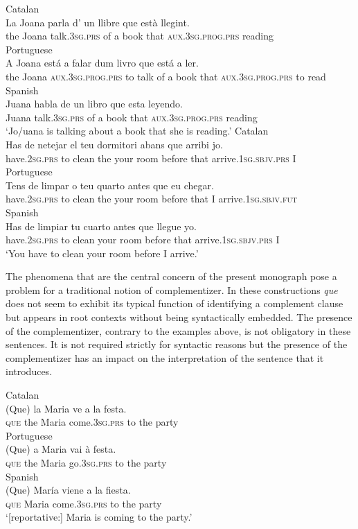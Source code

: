 \ea\label{ex:querel}
\ea
Catalan\\
\gll  La Joana parla d' un llibre que està llegint. \\
 the Joana talk.\textsc{3sg.prs} of a book 	that \textsc{aux.3sg.prog.prs} reading\\
	\ex
	Portuguese\\
	\gll A Joana está a  falar dum livro que está a ler. \\
	 the Joana \textsc{aux.3sg.prog.prs} to talk {of a} book 	that \textsc{aux.3sg.prog.prs} to read\\
\ex
Spanish\\
\gll Juana habla de un libro que esta leyendo. \\
Juana talk.\textsc{3sg.prs} of a book 	that \textsc{aux.3sg.prog.prs} reading\\
\glt`Jo/uana is talking about a book that she is reading.'
\z
\ex\label{ex:queadv} 
\ea
Catalan\\
\gll Has de netejar el teu dormitori abans que arribi jo. \\
have.\textsc{2sg.prs} to clean the your room before that arrive.\textsc{1sg.sbjv.prs} I\\
\ex
Portuguese\\
\gll Tens de limpar o teu quarto antes que eu chegar. \\
have.\textsc{2sg.prs} to clean the your room before that I arrive.\textsc{1sg.sbjv.fut} \\
\ex
Spanish\\
\gll Has de limpiar tu cuarto antes que  llegue yo. \\
have.\textsc{2sg.prs} to clean  your room before that arrive.\textsc{1sg.sbjv.prs}  I\\
\glt`You have to clean your room before I arrive.'
\z
\z


The phenomena that are the central concern of the present monograph pose a problem for a traditional notion of complementizer. In  these constructions \emph{que} does not seem to exhibit its typical function of identifying a complement clause but appears in root contexts  without being syntactically embedded.
The presence of the complementizer, contrary to the examples above, is not obligatory in these sentences. It  is not required strictly for syntactic reasons but the presence of the complementizer has an impact on the interpretation of the sentence that it introduces. 
 
\ea\label{ex:quereprep}
\ea Catalan\\
\gll  (Que) la Maria ve a la festa. \\
\textsc{que} the Maria come.\textsc{3sg.prs} to the party\\
\ex
Portuguese\\
\gll (Que) a Maria vai à  festa. \\
\textsc{que} the Maria go.\textsc{3sg.prs} {to the} party\\
\ex
Spanish\\
\gll  (Que) María viene a la fiesta. \\
\textsc{que}  Maria come.\textsc{3sg.prs} to the party\\
\glt`[reportative:] Maria is coming to the party.'
\z
\z


